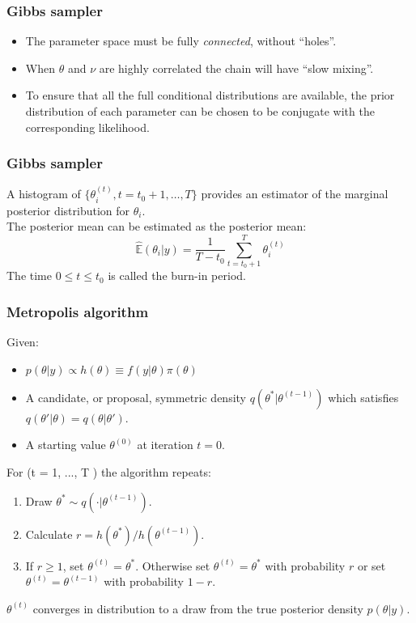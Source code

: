 \documentclass{beamer}
\newcommand{\E}{\mathbb{E}}
\newcommand{\1}{\ensuremath{\mathbf{1}}}
\begin{document}
%
%
%
\begin{frame}\frametitle{Gibbs sampler}
	\begin{itemize}
		\item The parameter space must be fully \emph{connected}, without ``holes''.
		\item When $\theta$ and $\nu$ are highly correlated the chain will have ``slow mixing''.
		\item To ensure that all the full conditional distributions are available, the prior distribution of each parameter can be chosen to be conjugate with the corresponding likelihood.
	\end{itemize}
\end{frame}
%
%
%
\begin{frame}\frametitle{Gibbs sampler}
	A histogram of $\{\theta_i^{(t)},t = t_0 +1,\ldots,T\}$ provides an estimator of the marginal posterior distribution for $\theta_i$.\\[2ex]
	The posterior mean can be estimated as the posterior mean:
	\begin{equation}
		\hat{\E}(\theta_i|y) = \frac{1}{T-t_0}\sum_{t=t_0+1}^T \theta_i^{(t)}
	\end{equation}
	The time $0 \leq t \leq t_0$ is called the burn-in period.
\end{frame}
%
%
%
\begin{frame}\frametitle{Metropolis algorithm}
	Given:
	\begin{itemize}
		\item $p(\theta|y) \propto h(\theta) \equiv f(y|\theta) \pi(\theta)$
		\item A candidate, or proposal, symmetric density $q(\theta^*|\theta^{(t-1)})$ which satisfies $q(\theta'|\theta) = q(\theta|\theta')$.
		\item A starting value $\theta^{(0)}$ at iteration $t = 0$.
	\end{itemize}
	For (t = 1, ..., T ) the algorithm repeats:
	\begin{enumerate}
		\item Draw $\theta^* \sim q(\cdot|\theta^{(t-1)})$.
		\item Calculate $r = h(\theta^*)/h(\theta^{(t-1)})$.
		\item If $r \geq 1$, set $\theta^{(t)} = \theta^*$. Otherwise set $\theta^{(t)} = \theta^*$ with probability $r$ or set $\theta^{(t)} = \theta^{(t-1)}$ with probability $1-r$.
	\end{enumerate}
	$\theta^{(t)}$ converges in distribution to a draw from the true posterior density $p(\theta|y)$.
\end{frame}
\end{document}
